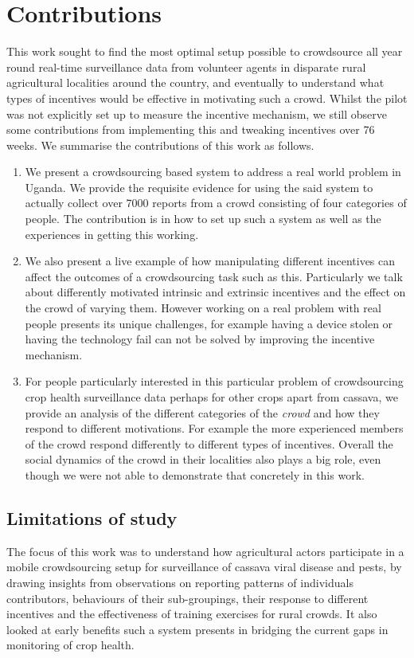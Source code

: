 \documentclass[letterpaper]{article} %
\begin{document}
\section{Contributions}
This work sought to find the most optimal setup possible to crowdsource all year round real-time surveillance data from volunteer agents in disparate rural agricultural localities around the country, and eventually to understand what types of incentives would be effective in motivating such a crowd. Whilst the pilot was not explicitly set up to measure the incentive mechanism, we still observe some contributions from implementing this and tweaking incentives over 76 weeks. We summarise the contributions of this work as follows.
\begin{enumerate}
\item We present a crowdsourcing based system to address a real world problem in Uganda. We provide the requisite evidence for using the said system to actually collect over 7000 reports from a crowd consisting of four categories of people. The contribution is in how to set up such a system as well as the experiences in getting this working.
\item We also present a live example of how manipulating different incentives can affect the outcomes of a crowdsourcing task such as this. Particularly we talk about differently motivated intrinsic and extrinsic incentives and the effect on the crowd of varying them. However working on a real problem with real people presents its unique challenges, for example having a device stolen or having the technology fail can not be solved by improving the incentive mechanism.
\item For people particularly interested in this particular problem of crowdsourcing crop health surveillance data perhaps for other crops apart from cassava, we provide an analysis of the different categories of the \emph{crowd} and how they respond to different motivations. For example the more experienced members of the crowd respond differently to different types of incentives. Overall the social dynamics of the crowd in their localities also plays a big role, even though we were not able to demonstrate that concretely in this work.
\end{enumerate}

\subsection{Limitations of study}
The focus of this work was to understand how agricultural actors participate in a mobile crowdsourcing setup for surveillance of cassava viral disease and pests, by drawing insights from observations on reporting patterns of individuals contributors, behaviours of  their sub-groupings, their response to different incentives and the effectiveness of training exercises for rural crowds. It also looked at early benefits such a system presents in bridging the current gaps in monitoring of crop health.
\end{document}
